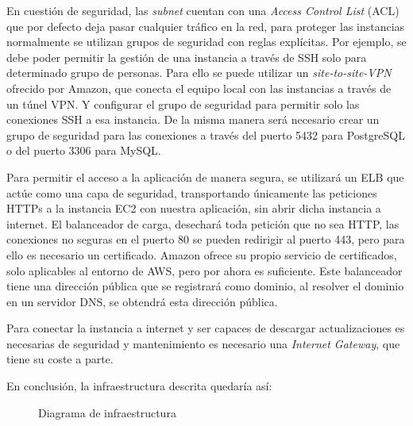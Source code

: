 En cuestión de seguridad, las \textit{subnet} cuentan con una \textit{Access Control List} (ACL) que por defecto deja pasar cualquier tráfico en la red, para proteger las instancias normalmente se utilizan grupos de seguridad con reglas explícitas. Por ejemplo, se debe poder permitir la gestión de una instancia a través de SSH solo para determinado grupo de personas. Para ello se puede utilizar un \textit{site-to-site-VPN} ofrecido por Amazon, que conecta el equipo local con las instancias a través de un túnel VPN. Y configurar el grupo de seguridad para permitir solo las conexiones SSH a esa instancia. De la misma manera será necesario crear un grupo de seguridad para las conexiones a través del puerto 5432 para PostgreSQL o del puerto 3306 para MySQL.

Para permitir el acceso a la aplicación de manera segura, se utilizará un ELB que actúe como una capa de seguridad, transportando únicamente las peticiones HTTPs a la instancia EC2 con nuestra aplicación, sin abrir dicha instancia a internet. El balanceador de carga, desechará toda petición que no sea HTTP, las conexiones no seguras en el puerto 80 se pueden redirigir al puerto 443, pero para ello es necesario un certificado. Amazon ofrece su propio servicio de certificados, solo aplicables al entorno de AWS, pero por ahora es suficiente. Este balanceador tiene una dirección pública que se registrará como dominio, al resolver el dominio en un servidor DNS, se obtendrá esta dirección pública. 

Para conectar la instancia a internet y ser capaces de descargar actualizaciones es necesarias de seguridad y mantenimiento es necesario una \textit{Internet Gateway}, que tiene su coste a parte. 

En conclusión, la infraestructura descrita quedaría así:
\begin{figure}[H]
    \caption{Diagrama de infraestructura}
    \label{fig:infra}
\end{figure}